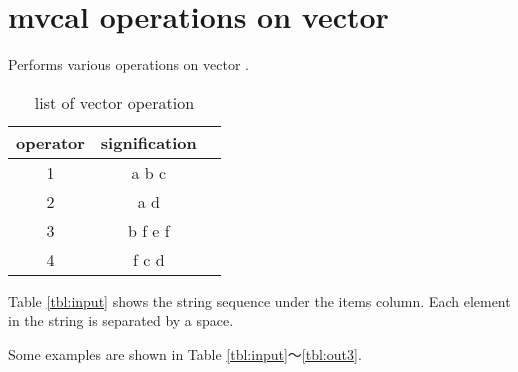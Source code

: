 \documentclass[a4paper]{jarticle}
\begin{document}
\renewcommand{\tablename}{Table }

\setlength{\baselineskip}{4mm}

\section*{mvcal operations on vector }
Performs various operations on vector .

\begin{table}[htbp]
\begin{center}
\caption{list of vector operation\label{tbl:ope}}
\begin{tabular}{ccc}
\hline
operator&signification \\
\hline
1&a b c \\
2&a d \\
3&b f e f \\
4&f c d \\
\hline
\end{tabular}
\end{center}
\end{table}

Table \ref{tbl:input} shows the string sequence under the items column. Each element in the string is separated by a space. 

Some examples are shown in Table \ref{tbl:input}〜\ref{tbl:out3}.
\end{document}
